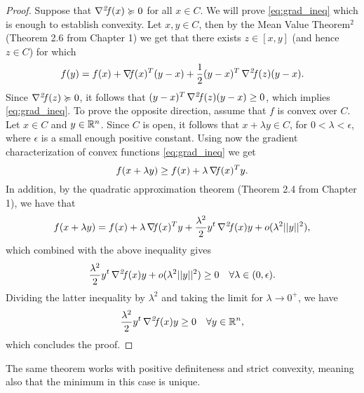 \documentclass[10pt,a4paper]{article}
\begin{document}
\begin{proof}
	Suppose that $\operatorname*{\mathit{\nabla^2 \!f}}(x) \succcurlyeq 0$ for all $x \in C$. We will prove \eqref{eq:grad_ineq} which is enough to establish convexity. Let $x,y\in C$, then by the Mean Value Theorem$^2$ (Theorem 2.6 from Chapter 1) we get that there exists $z\in[x,y]$ (and hence $z\in C$) for which 
	\begin{equation}\label{eq:mvt2_app}
		f(y) = f(x)+ \operatorname*{\mathit{\nabla \!f}} (x)^T(y-x) +\frac{1}{2}(y-x)^T\operatorname*{\mathit{\nabla^2 \!f}}(z)(y-x).
	\end{equation}
Since $\operatorname*{\mathit{\nabla^2 \!f}}(z) \succcurlyeq 0$, it follows that $(y-x)^T\operatorname*{\mathit{\nabla^2 \!f}}(z)(y-x)\geq0$, which implies \eqref{eq:grad_ineq}.
To prove the opposite direction, assume that $f$ is convex over $C$. Let $x\in C$ and $y\in \mathbb{R}^n$. Since $C$ is open, it follows that $x+\lambda y \in C$, for $0<\lambda<\epsilon$, where $\epsilon$ is a small enough positive constant. Using now the gradient characterization of convex functions \eqref{eq:grad_ineq} we get 
\begin{equation*}
	f(x+\lambda y) \geq f(x) + \lambda\operatorname*{\mathit{\nabla \!f}}(x)^Ty.
\end{equation*}
In addition, by the quadratic approximation theorem (Theorem 2.4 from Chapter 1), we have that 
\begin{equation*}
	f(x+\lambda y) = f(x) + \lambda \operatorname*{\mathit{\nabla \!f}}(x)^Ty + \frac{\lambda^2}{2}y^t\operatorname*{\mathit{\nabla^2 \!f}}(x)y + o(\lambda^2||y||^2),
\end{equation*}
which combined with the above inequality gives 
\begin{equation*}
	\frac{\lambda^2}{2}y^t\operatorname*{\mathit{\nabla^2 \!f}}(x)y + o(\lambda^2||y||^2) \geq 0 \quad \forall \lambda\in (0,\epsilon).
\end{equation*}
Dividing the latter inequality by $\lambda^2$ and taking the limit for $\lambda\to 0^+$, we have 
\begin{equation*}
	\frac{\lambda^2}{2}y^t\operatorname*{\mathit{\nabla^2 \!f}}(x)y \geq 0 \quad \forall y \in \mathbb{R}^n,
\end{equation*}
which concludes the proof.
\end{proof}
The same theorem works with positive definiteness and strict convexity, meaning also that the minimum in this case is unique.
\end{document}
